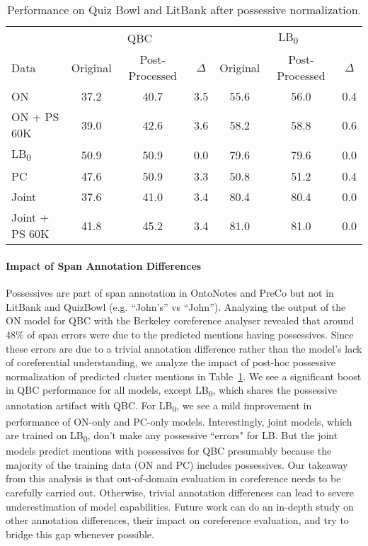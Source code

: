 \documentclass[12pt]{thesis-umich}[thesis]
\begin{document}
\begin{table}[t!]
	\centering
	\small{
	\begin{tabular}{lcccccc}
		\toprule
		 & \multicolumn{3}{c}{QBC} & \multicolumn{3}{c}{LB\textsubscript{0}} \\
		Data & Original & Post-Processed & $\Delta$ & Original & Post-Processed  & $\Delta$\\
		\midrule
		ON  &  
		37.2 & 40.7 & 3.5  & 55.6 & 56.0 & 0.4\\
		
		ON + PS 60K &  
		39.0 & 42.6 & 3.6  & 58.2 & 58.8 & 0.6\\
		
		LB\textsubscript{0} & 
		50.9 & 50.9 & 0.0 & 79.6 & 79.6 & 0.0\\
		
		PC & 
		47.6 & 50.9 & 3.3 & 50.8 & 51.2 & 0.4\\
		
		Joint & 
		37.6 & 41.0 & 3.4 & 80.4 & 80.4 & 0.0 \\
		
		Joint + PS 60K  & 
		41.8 & 45.2 & 3.4 & 81.0 & 81.0 & 0.0 \\ 
		
		\bottomrule
	\end{tabular}
	}
	\caption{Performance on Quiz Bowl and LitBank after possessive normalization.}
	\label{tab:possessive_normalization}
\end{table} \paragraph{Impact of Span Annotation Differences}
Possessives are part of span annotation in OntoNotes and PreCo but not in LitBank and QuizBowl  (e.g. ``John's'' vs ``John'').  
Analyzing the output of the ON model for QBC  with the Berkeley coreference analyser \cite{kummerfeld2013error} revealed that around 48\% of span errors were due to the predicted mentions having possessives. 
Since these errors are due to a trivial annotation difference rather than the model's lack of coreferential understanding, we analyze the impact of post-hoc  possessive normalization of predicted cluster mentions in Table~\ref{tab:possessive_normalization}. 
We see a significant boost in QBC performance for all models, except LB\textsubscript{0}, which shares the possessive annotation artifact with QBC. 
For LB\textsubscript{0}, we see a mild improvement in performance of ON-only and PC-only models. 
Interestingly, joint models, which are trained on LB\textsubscript{0}, don't make any possessive ``errors" for LB. But the joint models predict mentions with possessives for QBC presumably because the majority of the training data (ON and PC) includes possessives. 
Our takeaway from this analysis is that out-of-domain evaluation in coreference needs to be carefully carried out. Otherwise, trivial annotation differences can lead to severe underestimation of model capabilities. Future work can do an in-depth study on other annotation differences, their impact on coreference evaluation, and try to bridge this gap whenever possible.    
\end{document}
